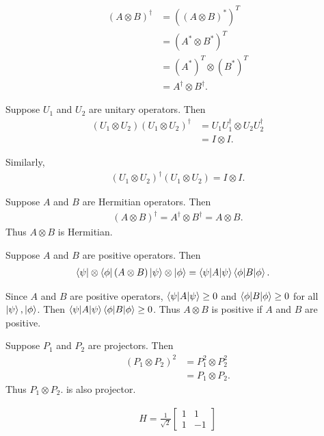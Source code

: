 \begin{align*}
	(A\otimes B)^\dagger&=((A \otimes B)^*)^T	\\
		&= (A^* \otimes B^*)^T\\
		&= (A^*)^T \otimes (B^*)^T\\
		&= A^\dagger \otimes B^\dagger.
\end{align*}

Suppose $U_1$ and $U_2$ are unitary operators. Then
\begin{align*}
	(U_1 \otimes U_2) (U_1 \otimes U_2)^\dagger &=U_1 U_1^\dagger \otimes U_2 U_2^\dagger\\
		&= I \otimes I.
\end{align*}

Similarly,
\begin{align*}
	(U_1 \otimes U_2)^\dagger (U_1 \otimes U_2)  = I \otimes I.
\end{align*}

Suppose $A$ and $B$ are Hermitian operators. Then
\begin{align}
(A \otimes B)^\dagger = A^\dagger \otimes B^\dagger = A \otimes B.
\end{align}
Thus $A \otimes B$ is Hermitian.




Suppose $A$ and $B$ are positive operators. Then
\begin{align*}
	\bra{\psi} \otimes \bra{\phi} (A \otimes B) \ket{\psi} \otimes \ket{\phi} &= \braket{\psi |A| \psi} \braket{\phi | B | \phi}.
\end{align*}

Since $A$ and $B$ are positive operators,
$\braket{\psi |A| \psi} \geq 0$ and $\braket{\phi | B | \phi} \geq 0$ for all $\ket{\psi}, \ket{\phi} $.
Then $\braket{\psi |A| \psi} \braket{\phi | B | \phi} \geq 0$.
Thus $A \otimes B$ is positive if $A$ and $B$ are positive.



Suppose $P_1$ and $P_2$  are projectors. Then
\begin{align*}
	(P_1 \otimes P_2) ^2 &= P_1^2 \otimes P_2^2\\
		&= P_1 \otimes P_2.
\end{align*}
Thus $ P_1 \otimes P_2.$ is also projector.


\begin{align}
	H  = \frac{1}{\sqrt{2}} \begin{bmatrix}
		1 & 1 \\
		1 & -1
	\end{bmatrix}
\end{align}

